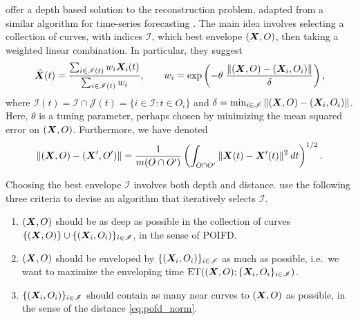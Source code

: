 \textcite{elias-jimenez-shang-2023} offer a depth based solution
to the reconstruction problem, adapted from a similar algorithm for
time-series forecasting \parencite{elias-jimenez-shang-2022}.
The main idea involves selecting a collection of curves, with indices
$\mathscr{I}$, which best envelope $(\bm{X}, O)$, then taking a weighted linear
combination.
In particular, they suggest
\begin{equation}
    \hat{\bm{X}}(t) = \frac{\sum_{i \in \mathscr{I}(t)} w_i \bm{X}_i(t)}{\sum_{i \in \mathscr{I}(t)} w_i}, \qquad
    w_i = \exp\left(-\theta\;\frac{\Vert (\bm{X}, O) - (\bm{X}_i, O_i) \Vert}{\delta}\right),
    \label{eq:pofd_predictor}
\end{equation}
where $\mathscr{I}(t) = \mathscr{I} \cap \mathscr{J}(t) = \{i \in
\mathscr{I}\colon t \in O_i\}$ and $\delta = \min_{i \in \mathscr{I}}
\Vert (\bm{X}, O) - (\bm{X}_i, O_i) \Vert$.
Here, $\theta$ is a tuning parameter, perhaps chosen by minimizing the mean
squared error on $(\bm{X}, O)$.
Furthermore, we have denoted
\begin{equation}
    \Vert (\bm{X}, O) - (\bm{X}', O') \Vert = \frac{1}{m(O \cap O')}\left(\int_{O \cap O'} \Vert \bm{X}(t) - \bm{X}'(t) \Vert^2 \:dt\right)^{1/2}.
    \label{eq:pofd_norm}
\end{equation}

Choosing the best envelope $\mathscr{I}$ involves both depth and distance.
\textcite{elias-jimenez-shang-2023} use the following three criteria to
devise an algorithm that iteratively selects $\mathscr{I}$.
\begin{enumerate}
    \item $(\bm{X}, O)$ should be as deep as possible in the collection of curves
    $\{(\bm{X}, O)\} \cup \{(\bm{X}_i, O_i)\}_{i \in \mathscr{I}}$, in the sense of
    POIFD.

    \item $(\bm{X}, O)$ should be enveloped by $\{(\bm{X}_i, O_i)\}_{i \in
    \mathscr{I}}$ as much as possible, i.e.\ we want to maximize the
    enveloping time $\operatorname{ET}((\bm{X}, O); \{\bm{X}_i, O_i\}_{i \in \mathscr{I}})$.

    \item $\{(\bm{X}_i, O_i)\}_{i \in \mathscr{I}}$ should contain as many near
    curves to $(\bm{X}, O)$ as possible, in the sense of the distance
    \ref{eq:pofd_norm}.
\end{enumerate}
